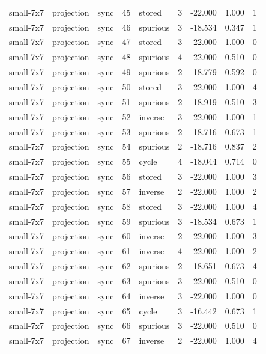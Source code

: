 \begin{tabular}{lllrlrrrr}
small-7x7 & projection & sync & 45 & stored & 3 & -22.000 & 1.000 & 1 \\
small-7x7 & projection & sync & 46 & spurious & 3 & -18.534 & 0.347 & 1 \\
small-7x7 & projection & sync & 47 & stored & 3 & -22.000 & 1.000 & 0 \\
small-7x7 & projection & sync & 48 & spurious & 4 & -22.000 & 0.510 & 0 \\
small-7x7 & projection & sync & 49 & spurious & 2 & -18.779 & 0.592 & 0 \\
small-7x7 & projection & sync & 50 & stored & 3 & -22.000 & 1.000 & 4 \\
small-7x7 & projection & sync & 51 & spurious & 2 & -18.919 & 0.510 & 3 \\
small-7x7 & projection & sync & 52 & inverse & 3 & -22.000 & 1.000 & 1 \\
small-7x7 & projection & sync & 53 & spurious & 2 & -18.716 & 0.673 & 1 \\
small-7x7 & projection & sync & 54 & spurious & 2 & -18.716 & 0.837 & 2 \\
small-7x7 & projection & sync & 55 & cycle & 4 & -18.044 & 0.714 & 0 \\
small-7x7 & projection & sync & 56 & stored & 3 & -22.000 & 1.000 & 3 \\
small-7x7 & projection & sync & 57 & inverse & 2 & -22.000 & 1.000 & 2 \\
small-7x7 & projection & sync & 58 & stored & 3 & -22.000 & 1.000 & 4 \\
small-7x7 & projection & sync & 59 & spurious & 3 & -18.534 & 0.673 & 1 \\
small-7x7 & projection & sync & 60 & inverse & 2 & -22.000 & 1.000 & 3 \\
small-7x7 & projection & sync & 61 & inverse & 4 & -22.000 & 1.000 & 2 \\
small-7x7 & projection & sync & 62 & spurious & 2 & -18.651 & 0.673 & 4 \\
small-7x7 & projection & sync & 63 & spurious & 3 & -22.000 & 0.510 & 0 \\
small-7x7 & projection & sync & 64 & inverse & 3 & -22.000 & 1.000 & 0 \\
small-7x7 & projection & sync & 65 & cycle & 3 & -16.442 & 0.673 & 1 \\
small-7x7 & projection & sync & 66 & spurious & 3 & -22.000 & 0.510 & 0 \\
small-7x7 & projection & sync & 67 & inverse & 2 & -22.000 & 1.000 & 4 \\

\end{tabular}
